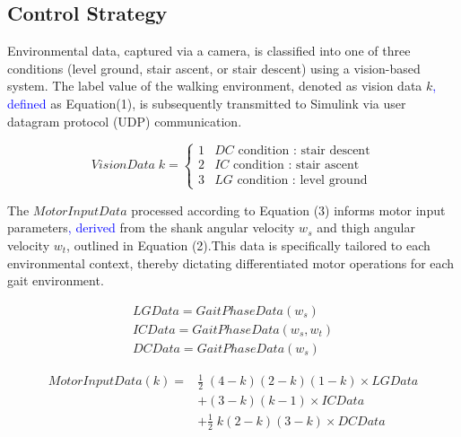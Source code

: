 \documentclass[journal,article,submit,pdftex,moreauthors]{Definitions/mdpi}
\begin{document}
\subsection{Control Strategy}
Environmental data, captured via a camera, is classified into one of three conditions (level ground, stair ascent, or stair descent) using a vision-based system. The label value of the walking environment, denoted as vision data $k$\textcolor{blue}{, defined} as Equation(1), is subsequently transmitted to Simulink via user datagram protocol (UDP) communication.
\begin{linenomath}
\begin{equation}
\text{$VisionData$}\; k =\begin{cases} 
1 & \text{$DC$ condition : stair descent} \\ 
2 & \text{$IC$ condition : stair ascent} \\
3 & \text{$LG$ condition : level ground}
\end{cases}
\end{equation}
\end{linenomath}
The $MotorInputData$ processed according to Equation (3) informs motor input parameters\textcolor{blue}{, derived} from the shank angular velocity $w_s$ and thigh angular velocity $w_t$, outlined in Equation (2).This data is specifically tailored to each environmental context, thereby dictating differentiated motor operations for each gait environment.
\begin{linenomath}
\begin{equation}
\begin{aligned}
\text{$LGData=GaitPhaseData(w_s)$} \\
\text{$ICData=GaitPhaseData(w_s,w_t)$} \\
\text{$DCData=GaitPhaseData(w_s)$}
\end{aligned}
\end{equation}
\end{linenomath}

\begin{linenomath}
\begin{equation}
\begin{aligned}
\text{$MotorInputData$}(k) = & \frac{1}{2}\;(4-k)(2-k)(1-k) \times \text{$LGData$}\\
& + (3-k)(k-1) \times \text{$ICData$}\\
& + \frac{1}{2}\;k(2-k)(3-k) \times \text{$DCData$} 
\end{aligned}
\end{equation}
\end{linenomath}
\end{document}
